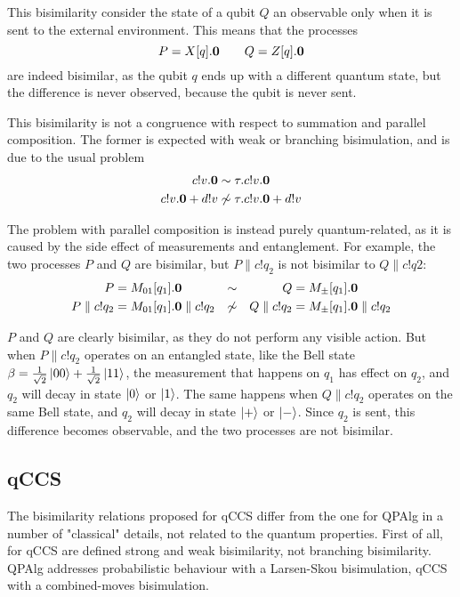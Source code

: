 This bisimilarity consider the state of a qubit $Q$ an observable only when it is sent to the external environment. This means that the processes 
\[ P = X[q].\mathbf{0} \qquad Q = Z[q].\mathbf{0}\]
are indeed bisimilar, as the qubit $q$ ends up with a different quantum state, but the difference is never observed, because the qubit is never sent.

This bisimilarity is not a congruence with respect to summation and parallel composition. The former is expected with weak or branching bisimulation, and is due to the usual problem 
\begin{align*}
c!v.\mathbf{0} &\sim \tau.c!v.\mathbf{0} \\
c!v.\mathbf{0} + d!v &\not\sim \tau.c!v.\mathbf{0} + d!v
\end{align*}

The problem with parallel composition is instead purely quantum-related, as it is caused by the side effect of measurements and entanglement. For example, the two processes $P$ and $Q$ are bisimilar, but $P\parallel c!q_2$ is not bisimilar to $Q \parallel c!q2$:
\begin{align*}
 P &= M_{01}[q_1].\mathbf{0} &\sim & & Q &= M_\pm[q_1].\mathbf{0} \\ 
 P \parallel c!q_2 &=  M_{01}[q_1].\mathbf{0} \parallel c!q_2 &\not\sim & & Q \parallel c!q_2 &=  M_\pm[q_1].\mathbf{0} \parallel c!q_2 
\end{align*} 

$P$ and $Q$ are clearly bisimilar, as they do not perform any visible action. But when $P\parallel c!q_2$ operates on an entangled state, like the Bell state $\beta = \frac{1}{\sqrt{2}}\ket{00} + \frac{1}{\sqrt{2}}\ket{11}$, the measurement that happens on $q_1$ has effect on $q_2$, and $q_2$ will decay in state $\ket{0}$ or $\ket{1}$. The same happens when $Q\parallel c!q_2$ operates on the same Bell state, and $q_2$ will decay in state $\ket{+}$ or $\ket{-}$. Since $q_2$ is sent, this difference becomes observable, and the two processes are not bisimilar.

\subsection{qCCS}

The bisimilarity relations proposed for qCCS differ from the one for QPAlg in a number of "classical" details, not related to the quantum properties. First of all, for qCCS are defined strong and weak bisimilarity, not branching bisimilarity. QPAlg addresses probabilistic behaviour with a Larsen-Skou bisimulation, qCCS with a combined-moves bisimulation.

